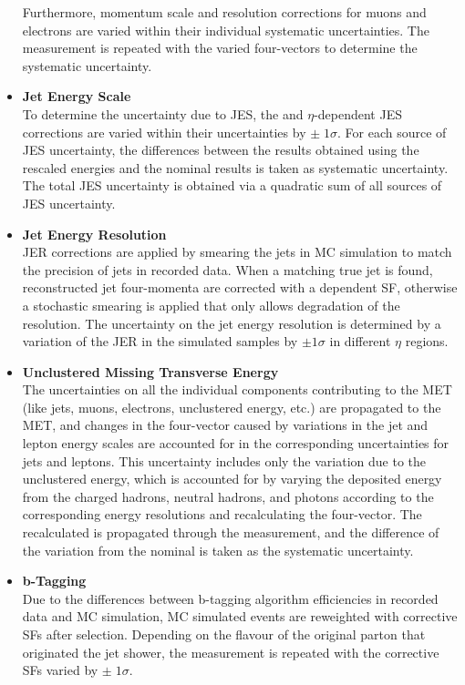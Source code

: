 \begin{itemize}
    Furthermore, momentum scale and resolution corrections for muons and electrons are varied within their individual systematic uncertainties. 
    The measurement is repeated with the varied four-vectors to determine the systematic uncertainty.
    \item {\bf Jet Energy Scale} \\
    To determine the uncertainty due to JES, the \pT and $\eta$-dependent JES corrections are varied within their uncertainties by $\pm \; 1 \sigma$. 
    For each source of JES uncertainty, the differences between the results obtained using the rescaled energies and the nominal results is taken as systematic uncertainty. 
    The total JES uncertainty is obtained via a quadratic sum of all sources of JES uncertainty.
    \item {\bf Jet Energy Resolution} \\
    JER corrections are applied by smearing the jets in MC simulation to match the precision of jets in recorded data.
    When a matching true jet is found, reconstructed jet four-momenta are corrected with a \pT dependent SF, otherwise a stochastic smearing is applied that only allows degradation of the resolution.
    The uncertainty on the jet energy resolution is determined by a variation of the JER in the simulated samples by $\pm 1\sigma$ in different $\eta$ regions.
    \item {\bf Unclustered Missing Transverse Energy} \\
    The uncertainties on all the individual components contributing to the MET (like jets, muons, electrons, unclustered energy, etc.) are propagated to the MET, and changes in the \ETmiss four-vector caused by variations in the jet and lepton energy scales are accounted for in the corresponding uncertainties for jets and leptons.
    This uncertainty includes only the variation due to the unclustered energy, which is accounted for by varying the deposited energy from the charged hadrons, neutral hadrons, and photons according to the corresponding energy resolutions and recalculating the \ETmiss four-vector. 
    The recalculated \ETmiss is propagated through the measurement, and the difference of the variation from the nominal is taken as the systematic uncertainty.
    \item {\bf b-Tagging} \\
    Due to the differences between b-tagging algorithm efficiencies in recorded data and MC simulation, MC simulated events are reweighted with corrective SFs after selection.
    Depending on the flavour of the original parton that originated the jet shower, the measurement is repeated with the corrective SFs varied by $\pm \; 1 \sigma$.

\end{itemize}
